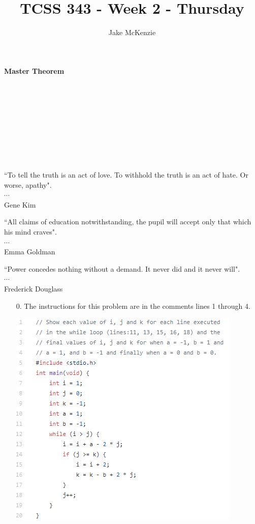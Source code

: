 \documentclass[12pt]{article}
\begin{document}
\title{TCSS 343 - Week 2 - Thursday}
\author{Jake McKenzie}
\maketitle
\noindent\centerline{\textbf{Master Theorem}}\\\\\\\\\\\\\\\\
\begin{center}
    ``To tell the truth is an act of love. To withhold the truth is an act of hate. Or worse, apathy". \\$\cdots$\\ Gene Kim
\end{center}
\begin{center}
    ``All claims of education notwithstanding, the pupil will accept only that which his mind craves". \\$\cdots$\\ Emma Goldman
\end{center}
\begin{center}
    ``Power concedes nothing without a demand. It never did and it never will". \\$\cdots$\\ Frederick Douglass
\end{center}
\newpage
\begin{enumerate}
\item[0.] The instructions for this problem are in the comments 
lines 1 through 4. \\
\centerline{\includegraphics{debug.jpg}} 
\newpage 
\end{enumerate}
\end{document}
